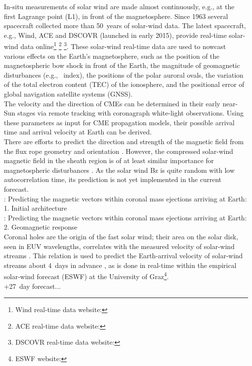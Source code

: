 In-situ measurements of solar wind are made almost continuously, e.g., at the first Lagrange point (L1), in front of the magnetosphere. Since 1963 several spacecraft collected more than 50~years of solar-wind data. The latest spacecraft, e.g., Wind, ACE and DSCOVR (launched in early 2015), provide real-time solar-wind data online\footnote{Wind real-time data website: } \footnote{ACE real-time data website: } \footnote{DSCOVR real-time data website: }.
These solar-wind real-time data are used to nowcast various effects on the Earth's magnetosphere, such as the position of the magnetospheric bow shock in front of the Earth, the magnitude of geomagnetic disturbances (e.g., \Kp~index), the positions of the polar auroral ovals, the variation of the total electron content (TEC) of the ionosphere, and the positional error of global navigation satellite systems (GNSS).\\


The velocity and the direction of CMEs can be determined in their early near-Sun stages via remote tracking with coronagraph white-light observations. Using these parameters as input for CME propagation models, their possible arrival time and arrival velocity at Earth can be derived.\\

There are efforts to predict the direction and strength of the magnetic field from the flux rope geometry and orientation \citep{Savani2015}. However, the compressed solar-wind magnetic field in the sheath region is of at least similar importance for magnetospheric disturbances \citep{Huttunen2004}. As the solar wind Bz is quite random with low autocorrelation time, its prediction is not yet implemented in the current forecast.\\

\citet{Savani2015}: Predicting the magnetic vectors within coronal mass ejections arriving at Earth: 1. Initial architecture\\
\citet{Savani2017}: Predicting the magnetic vectors within coronal mass ejections arriving at Earth: 2. Geomagnetic response\\

Coronal holes are the origin of the fast solar wind; their area on the solar disk, seen in EUV wavelengths, correlates with the measured velocity of solar-wind streams \citep{Vrsnak2007}. This relation is used to predict the Earth-arrival velocity of solar-wind streams about 4~days in advance \citep{Rotter2012}, as is done in real-time within the empirical solar-wind forecast (ESWF) at the University of Graz\footnote{ESWF website: }.\\
+27~day forecast...\\

